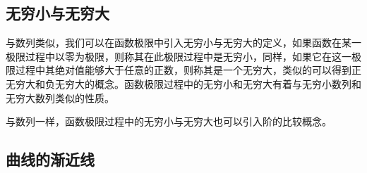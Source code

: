 \subsection{无穷小与无穷大}
\label{sec:infinite-small-and-great}

与数列类似，我们可以在函数极限中引入无穷小与无穷大的定义，如果函数在某一极限过程中以零为极限，则称其在此极限过程中是无穷小，同样，如果它在这一极限过程中其绝对值能够大于任意的正数，则称其是一个无穷大，类似的可以得到正无穷大和负无穷大的概念。函数极限过程中的无穷小和无穷大有着与无穷小数列和无穷大数列类似的性质。

与数列一样，函数极限过程中的无穷小与无穷大也可以引入阶的比较概念。

\subsection{曲线的渐近线}
\label{sec:asymptotic-line-of-curve}



